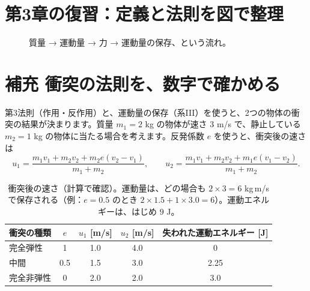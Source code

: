 \documentclass[a4paper,11pt,openany]{ltjsbook}
\begin{document}
\section{第3章の復習：定義と法則を図で整理}

\begin{figure}[htbp]
\centering
{}
\caption{質量 → 運動量 → 力 → 運動量の保存、という流れ。}
\end{figure}

\section{補充 衝突の法則を、数字で確かめる}

第3法則（作用・反作用）と、運動量の保存（系III）を使うと、2つの物体の衝突の結果が決まります。質量 $m_1=2$ kg の物体が速さ $3$ m/s で、静止している $m_2=1$ kg の物体に当たる場合を考えます。反発係数 $e$ を使うと、衝突後の速さは
\[
u_1=\frac{m_1v_1+m_2v_2+m_2e(v_2-v_1)}{m_1+m_2},\qquad
u_2=\frac{m_1v_1+m_2v_2+m_1e(v_1-v_2)}{m_1+m_2}.
\]

\begin{table}[htbp]
\centering
\begin{tabular}{lcccc}
\toprule
衝突の種類 & $e$ & $u_1$ [m/s] & $u_2$ [m/s] & 失われた運動エネルギー [J]\\
\midrule
完全弾性 & 1 & 1.0 & 4.0 & 0\\
中間 & 0.5 & 1.5 & 3.0 & 2.25\\
完全非弾性 & 0 & 2.0 & 2.0 & 3.0\\
\bottomrule
\end{tabular}
\caption{衝突後の速さ（計算で確認）。運動量は、どの場合も $2\times3=6$ kg\,m/s で保存される（例：$e=0.5$ のとき $2\times1.5+1\times3.0=6$）。運動エネルギーは、はじめ $9$ J。}
\end{table}
\end{document}
